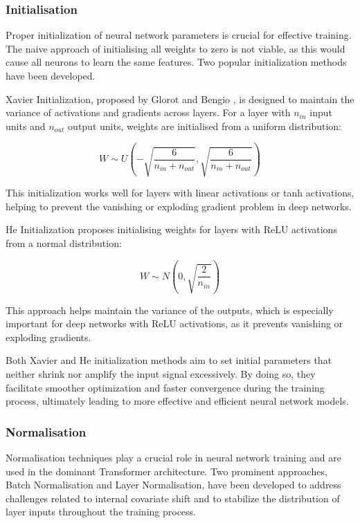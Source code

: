 \documentclass[a4paper, oneside]{discothesis}
\begin{document}
\subsubsection{Initialisation}

Proper initialization of neural network parameters is crucial for effective training. The naive approach of initialising all weights to zero is not viable, as this would cause all neurons to learn the same features. Two popular initialization methods have been developed.

Xavier Initialization, proposed by Glorot and Bengio \cite{glorot2010understanding}, is designed to maintain the variance of activations and gradients across layers. For a layer with $n_{in}$ input units and $n_{out}$ output units, weights are initialised from a uniform distribution:

\begin{equation}
    W \sim U\left(-\sqrt{\frac{6}{n_{in} + n_{out}}}, \sqrt{\frac{6}{n_{in} + n_{out}}}\right)
\end{equation}

This initialization works well for layers with linear activations or tanh activations, helping to prevent the vanishing or exploding gradient problem in deep networks.

He Initialization \cite{he2015delvingdeeprectifierssurpassing} proposes initialising weights for layers with ReLU activations from a normal distribution:

\begin{equation}
    W \sim N\left(0, \sqrt{\frac{2}{n_{in}}}\right)
\end{equation}

This approach helps maintain the variance of the outputs, which is especially important for deep networks with ReLU activations, as it prevents vanishing or exploding gradients.

Both Xavier and He initialization methods aim to set initial parameters that neither shrink nor amplify the input signal excessively. By doing so, they facilitate smoother optimization and faster convergence during the training process, ultimately leading to more effective and efficient neural network models.

\subsubsection{Normalisation}

Normalisation techniques play a crucial role in neural network training and are used in the dominant Transformer architecture. Two prominent approaches, Batch Normalisation and Layer Normalisation, have been developed to address challenges related to internal covariate shift and to stabilize the distribution of layer inputs throughout the training process.
\end{document}
